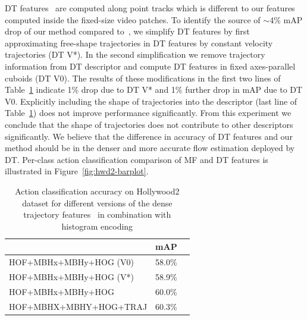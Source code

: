 \documentclass[10pt,twocolumn,letterpaper]{article}
\begin{document}

DT features~\cite{Wang12} are computed along point tracks which is different to our features computed inside the fixed-size video patches. To identify the source of $\sim$4\% mAP drop of our method compared to~\cite{Wang12}, we simplify DT features by first approximating free-shape trajectories in DT features by constant velocity trajectories (DT V*). In the second simplification we remove trajectory information from DT descriptor and compute DT features in fixed axes-parallel cuboids (DT V0). The results of these modifications in the first two lines of Table~\ref{tab:HWD2traj} indicate 1\% drop due to DT V* and 1\% further drop in mAP due to DT V0. Explicitly including the shape of trajectories into the descriptor (last line of Table~\ref{tab:HWD2traj}) does not improve performance significantly. From this experiment we conclude that the shape of trajectories does not contribute to other descriptors significantly. We believe that the difference in accuracy of DT features and our method should be in the denser and more accurate flow estimation deployed by DT. Per-class action classification comparison of MF and DT features is illustrated in Figure~\ref{fig:hwd2-barplot}.

\begin{table}
\begin{center}
\begin{tabular}{|l|c|c|}
\hline
& mAP \\\hline
HOF+MBHx+MBHy+HOG (V0)  					& 58.0\%	\\\hline
HOF+MBHx+MBHy+HOG (V*)						& 58.9\%	\\\hline
HOF+MBHx+MBHy+HOG \cite{Wang12}     	& 60.0\% 	\\\hline
HOF+MBHX+MBHY+HOG+TRAJ \cite{Wang12} 	& 60.3\% 	\\\hline
\end{tabular}
\mbox{}\vspace{.2cm}\\
\caption{Action classification accuracy on Hollywood2 dataset for different versions of the dense trajectory features~\cite{Wang12} in combination with histogram encoding}
\label{tab:HWD2traj}
\end{center}
\end{table}
\end{document}
